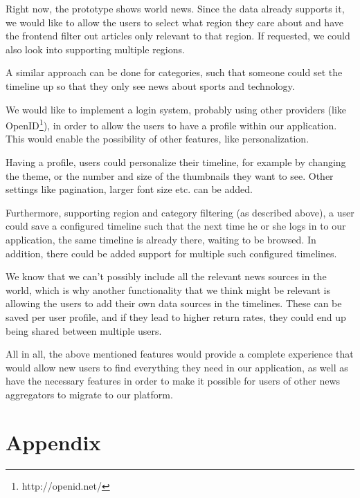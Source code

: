 \documentclass{acm_proc_10ptArticle-sp}
\begin{document}
Right now, the prototype shows world news. Since the data already supports it, we would like to allow the users to select what region they care about and have the frontend filter out articles only relevant to that region. If requested, we could also look into supporting multiple regions.

A similar approach can be done for categories, such that someone could set the timeline up so that they only see news about sports and technology.

We would like to implement a login system, probably using other providers (like OpenID\footnote{http://openid.net/}), in order to allow the users to have a profile within our application. This would enable the possibility of other features, like personalization.

Having a profile, users could personalize their timeline, for example by changing the theme, or the number and size of the thumbnails they want to see. Other settings like pagination, larger font size etc. can be added.

Furthermore, supporting region and category filtering (as described above), a user could save a configured timeline such that the next time he or she logs in to our application, the same timeline is already there, waiting to be browsed. In addition, there could be added support for multiple such configured timelines.

We know that we can't possibly include all the relevant news sources in the world, which is why another functionality that we think might be relevant is allowing the users to add their own data sources in the timelines. These can be saved per user profile, and if they lead to higher return rates, they could end up being shared between multiple users.

All in all, the above mentioned features would provide a complete experience that would allow new users to find everything they need in our application, as well as have the necessary features in order to make it possible for users of other news aggregators to migrate to our platform.







\newpage

\onecolumn
\section{Appendix}
\end{document}
